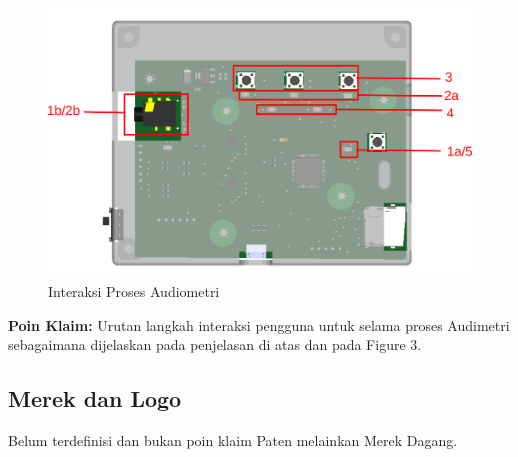 \documentclass[12pt,]{article}
\begin{document}
	\begin{figure}[!ht]
		\centering
		\includegraphics[width=400pt]{images/fig_3_metri}
		\caption{Interaksi Proses Audiometri}
	\end{figure}

	\textbf{Poin Klaim:} Urutan langkah interaksi pengguna untuk selama proses Audimetri sebagaimana dijelaskan
	pada penjelasan di atas dan pada Figure 3.
	
	\newpage
	\subsection{Merek dan Logo}
	
	Belum terdefinisi dan bukan poin klaim Paten melainkan Merek Dagang.
	
\end{document}
